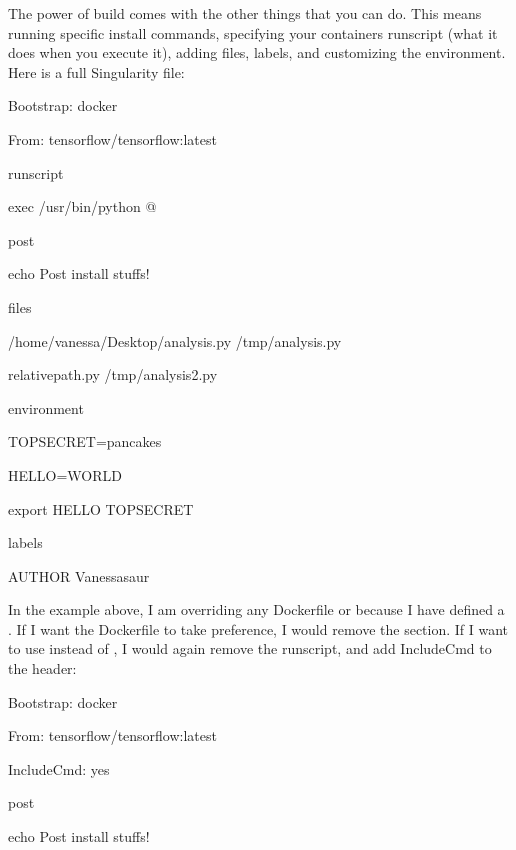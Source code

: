 \documentclass[letterpaper,10pt,english]{sphinxmanual}
\begin{document}
The power of build comes with the other things that you can do. This
means running specific install commands, specifying your containers
runscript (what it does when you execute it), adding files, labels, and
customizing the environment. Here is a full Singularity file:

%
\begin{sphinxVerbatim}[commandchars=\\\{\}]
Bootstrap: docker

From: tensorflow/tensorflow:latest


\PYGZpc{}runscript

    exec /usr/bin/python \PYGZdq{}\PYGZdl{}@\PYGZdq{}


\PYGZpc{}post

    echo \PYGZdq{}Post install stuffs!\PYGZdq{}


\PYGZpc{}files

/home/vanessa/Desktop/analysis.py /tmp/analysis.py

relative\PYGZus{}path.py /tmp/analysis2.py


\PYGZpc{}environment

TOPSECRET=pancakes

HELLO=WORLD

export HELLO TOPSECRET


\PYGZpc{}labels

AUTHOR Vanessasaur
\end{sphinxVerbatim}

In the example above, I am overriding any Dockerfile  or  because I have
defined a  . If I want the Dockerfile  to take preference, I would remove
the  section. If I want to use  instead of  , I would again remove the
runscript, and add IncludeCmd to the header:

%
\begin{sphinxVerbatim}[commandchars=\\\{\}]
Bootstrap: docker

From: tensorflow/tensorflow:latest

IncludeCmd: yes


\PYGZpc{}post


    echo \PYGZdq{}Post install stuffs!\PYGZdq{}
\end{sphinxVerbatim}
\end{document}
